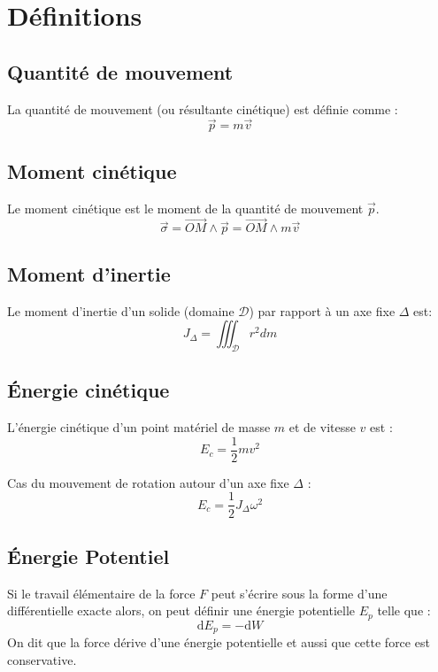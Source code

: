 \documentclass[a4paper,12pt]{article}
\newcommand{\diff}{\mathrm{d}} %
\renewcommand{\vec}{\overrightarrow}  %
\begin{document}
    \section{Définitions}

    \begin{multicols}{2}
        
        \subsection{Quantité de mouvement}
            La quantité de mouvement (ou résultante cinétique) est définie comme :
                $$\vec{p} = m \vec{v}$$

        \subsection{Moment cinétique}
            Le moment cinétique est le moment de la quantité de mouvement $\vec{p}$.
                $$ \vec \sigma = \vec{OM} \wedge \vec p = \vec{OM} \wedge m \vec v $$
        
        \subsection{Moment d'inertie}
            Le moment d'inertie d'un solide (domaine $\mathcal{D}$) par rapport à un axe fixe $\Delta$ est:
                $$ J_\Delta = \iiint_{\mathcal{D}} r^2 dm $$



        \subsection{Énergie cinétique}
            L'énergie cinétique d'un point matériel de masse $m$ et de vitesse $v$ est : 
                $$ E_c = \frac{1}{2} m v^2 $$

            Cas du mouvement de rotation autour d'un axe fixe $\Delta$ :
                $$ E_c = \frac{1}{2} J_\Delta \omega^2 $$

        \subsection{Énergie Potentiel}

            Si le travail élémentaire de la force $F$ peut s'écrire sous la
            forme d'une différentielle exacte alors, on peut définir
            une énergie potentielle $E_p$ telle que :
            $$ \diff E_p = -\diff W $$
            On dit que la force dérive d'une énergie potentielle et 
            aussi que cette force est conservative.


\end{multicols}
\end{document}
